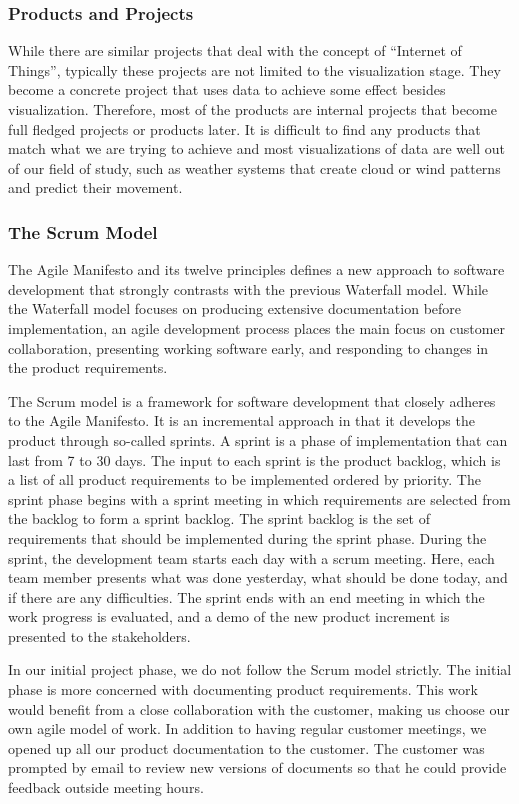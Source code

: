 \documentclass[../document]{subfiles}
\begin{document}
\subsubsection{Products and Projects}
While there are similar projects that deal with the concept of “Internet of Things”, typically these projects are not limited to the visualization stage. They become a concrete project that uses data to achieve some effect besides visualization. Therefore, most of the products are internal projects that become full fledged projects or products later. It is difficult to find any products that match what we are trying to achieve and most visualizations of data are well out of our field of study, such as weather systems that create cloud or wind patterns and predict their movement.

\subsubsection{The Scrum Model}
\label{the_scrum_model}
The Agile Manifesto and its twelve principles defines a new approach to software development that strongly contrasts with the previous Waterfall model. While the Waterfall model focuses on producing extensive documentation before implementation, an agile development process places the main focus on customer collaboration, presenting working software early, and responding to changes in the product requirements. 

The Scrum model is a framework for software development that closely adheres to the Agile Manifesto. It is an incremental approach in that it develops the product through so-called sprints. A sprint is a phase of implementation that can last from 7 to 30 days. The input to each sprint is the product backlog, which is a list of all product requirements to be implemented ordered by priority. The sprint phase begins with a sprint meeting in which requirements are selected from the backlog to form a sprint backlog. The sprint backlog is the set of requirements that should be implemented during the sprint phase. During the sprint, the development team starts each day with a scrum meeting. Here, each team member presents what was done yesterday, what should be done today, and if there are any difficulties. The sprint ends with an end meeting in which the work progress is evaluated, and a demo of the new product increment is presented to the stakeholders.

In our initial project phase, we do not follow the Scrum model strictly. The initial phase is more concerned with documenting product requirements. This work would benefit from a close collaboration with the customer, making us choose our own agile model of work. In addition to having regular customer meetings, we opened up all our product documentation to the customer. The customer was prompted by email to review new versions of documents so that he could provide feedback outside meeting hours.
\end{document}
